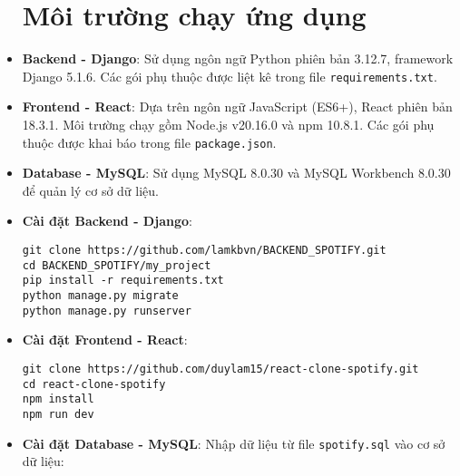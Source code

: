 \begin{itemize}
	\section{Môi trường chạy ứng dụng}
	\item \textbf{Backend - Django}: Sử dụng ngôn ngữ Python phiên bản 3.12.7, framework Django 5.1.6. Các gói phụ thuộc được liệt kê trong file \texttt{requirements.txt}.
	
	\item \textbf{Frontend - React}: Dựa trên ngôn ngữ JavaScript (ES6+), React phiên bản 18.3.1. Môi trường chạy gồm Node.js v20.16.0 và npm 10.8.1. Các gói phụ thuộc được khai báo trong file \texttt{package.json}.
	
	\item \textbf{Database - MySQL}: Sử dụng MySQL 8.0.30 và MySQL Workbench 8.0.30 để quản lý cơ sở dữ liệu.
\end{itemize}

\vspace{1em}

\begin{itemize}
	\section{Cách cài đặt}
	\item \textbf{Cài đặt Backend - Django}:
	\begin{verbatim}
git clone https://github.com/lamkbvn/BACKEND_SPOTIFY.git
cd BACKEND_SPOTIFY/my_project
pip install -r requirements.txt
python manage.py migrate
python manage.py runserver
	\end{verbatim}

	\item \textbf{Cài đặt Frontend - React}:
	\begin{verbatim}
git clone https://github.com/duylam15/react-clone-spotify.git
cd react-clone-spotify
npm install
npm run dev
	\end{verbatim}

	\item \textbf{Cài đặt Database - MySQL}:
	Nhập dữ liệu từ file \texttt{spotify.sql} vào cơ sở dữ liệu:
	\begin{verbatim}
	\end{verbatim}
\end{itemize}
